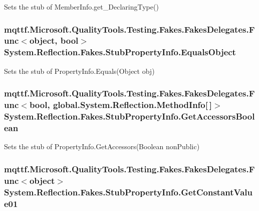 Sets the stub of Member\-Info.\-get\-\_\-\-Declaring\-Type()

\hypertarget{class_system_1_1_reflection_1_1_fakes_1_1_stub_property_info_a75d79fd5c2a5d9c098e3939fa93057b0}{
\subsubsection[{Equals\-Object}]{\setlength{\rightskip}{0pt plus 5cm}mqttf.\-Microsoft.\-Quality\-Tools.\-Testing.\-Fakes.\-Fakes\-Delegates.\-Func$<$object, bool$>$ System.\-Reflection.\-Fakes.\-Stub\-Property\-Info.\-Equals\-Object}}\label{class_system_1_1_reflection_1_1_fakes_1_1_stub_property_info_a75d79fd5c2a5d9c098e3939fa93057b0}


Sets the stub of Property\-Info.\-Equals(\-Object obj)

\hypertarget{class_system_1_1_reflection_1_1_fakes_1_1_stub_property_info_a3b688d9cc111a9b53125206a95c7886a}{
\subsubsection[{Get\-Accessors\-Boolean}]{\setlength{\rightskip}{0pt plus 5cm}mqttf.\-Microsoft.\-Quality\-Tools.\-Testing.\-Fakes.\-Fakes\-Delegates.\-Func$<$bool, global.\-System.\-Reflection.\-Method\-Info\mbox{[}$\,$\mbox{]}$>$ System.\-Reflection.\-Fakes.\-Stub\-Property\-Info.\-Get\-Accessors\-Boolean}}\label{class_system_1_1_reflection_1_1_fakes_1_1_stub_property_info_a3b688d9cc111a9b53125206a95c7886a}


Sets the stub of Property\-Info.\-Get\-Accessors(\-Boolean non\-Public)

\hypertarget{class_system_1_1_reflection_1_1_fakes_1_1_stub_property_info_a34a2725d50457ae19ec4e3b7f92a3bb5}{
\subsubsection[{Get\-Constant\-Value01}]{\setlength{\rightskip}{0pt plus 5cm}mqttf.\-Microsoft.\-Quality\-Tools.\-Testing.\-Fakes.\-Fakes\-Delegates.\-Func$<$object$>$ System.\-Reflection.\-Fakes.\-Stub\-Property\-Info.\-Get\-Constant\-Value01}}\label{class_system_1_1_reflection_1_1_fakes_1_1_stub_property_info_a34a2725d50457ae19ec4e3b7f92a3bb5}


